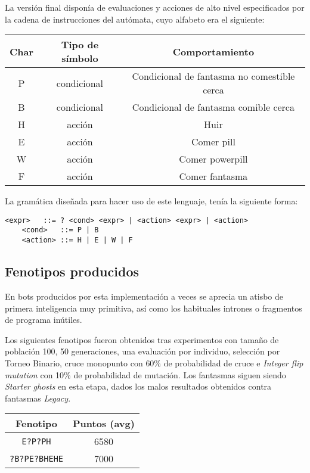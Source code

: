\blankline

La versión final disponía de evaluaciones y acciones de alto nivel especificados por la cadena de instrucciones del autómata, cuyo alfabeto era el siguiente:
\begin{table}[H]
\centering
\begin{tabular}{ccc}
\hline
\textbf{Char} & \textbf{Tipo de símbolo} & \textbf{Comportamiento}                     \\ \hline
P             & condicional              & Condicional de fantasma no comestible cerca \\
B             & condicional              & Condicional de fantasma comible cerca       \\
H             & acción                   & Huir                                        \\
E             & acción                   & Comer pill                                  \\
W             & acción                   & Comer powerpill                             \\
F             & acción                   & Comer fantasma                              \\ \hline
\end{tabular}
\end{table}

La gramática diseñada para hacer uso de este lenguaje, tenía la siguiente forma:
\begin{lstlisting}[frame=single, breaklines=no, basicstyle=\fontsize{10}{11}\ttfamily]
    <expr>   ::= ? <cond> <expr> | <action> <expr> | <action>
    <cond>   ::= P | B
    <action> ::= H | E | W | F
\end{lstlisting}

\subsection{Fenotipos producidos}
En bots producidos por esta implementación a veces se aprecia un atisbo de primera inteligencia muy primitiva, así como los habituales intrones o fragmentos de programa inútiles.
 
Los siguientes fenotipos fueron obtenidos tras experimentos con tamaño de población 100, 50 generaciones, una evaluación por individuo, selección por Torneo Binario, cruce monopunto con 60\% de probabilidad de cruce e \textit{Integer flip mutation} con 10\% de probabilidad de mutación. Los fantasmas siguen siendo \textit{Starter ghosts} en esta etapa, dados los malos resultados obtenidos contra fantasmas \textit{Legacy}.
\begin{table}[H]
\centering
\begin{tabular}{cc}
\hline
\textbf{Fenotipo} & \textbf{Puntos (avg)} \\ \hline
\texttt{E?P?PH}          & 6580                  \\
\texttt{?B?PE?BHEHE}          & 7000                  \\ \hline
\end{tabular}
\end{table}

